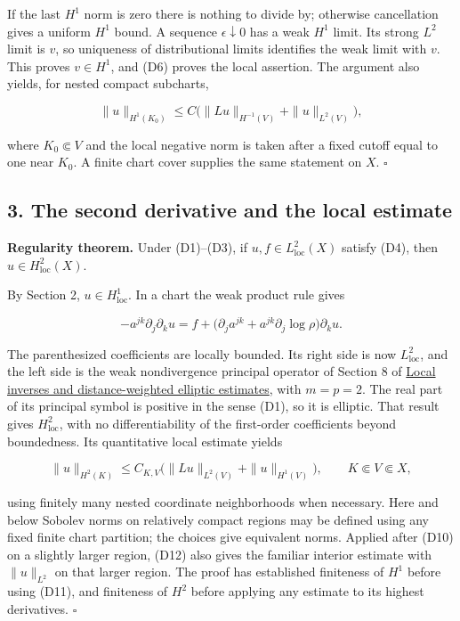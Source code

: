 \documentclass[
  11pt,
]{article}
\begin{document}
If the last \(H^1\) norm is zero there is nothing to divide by;
otherwise cancellation gives a uniform \(H^1\) bound. A sequence
\(\epsilon\downarrow0\) has a weak \(H^1\) limit. Its strong \(L^2\)
limit is \(v\), so uniqueness of distributional limits identifies the
weak limit with \(v\). This proves \(v\in H^1\), and (D6) proves the
local assertion. The argument also yields, for nested compact subcharts,

\[
 \|u\|_{H^1(K_0)}\leq C\bigl(\|Lu\|_{H^{-1}(V)}
                                      +\|u\|_{L^2(V)}\bigr),    \tag{D10}
\]

where \(K_0\Subset V\) and the local negative norm is taken after a
fixed cutoff equal to one near \(K_0\). A finite chart cover supplies
the same statement on \(X\). \(\square\)

\subsection{3. The second derivative and the local
estimate}\label{the-second-derivative-and-the-local-estimate}

\textbf{Regularity theorem.} Under (D1)--(D3), if
\(u,f\in L^2_{\mathrm{loc}}(X)\) satisfy (D4), then
\(u\in H^2_{\mathrm{loc}}(X)\).

By Section 2, \(u\in H^1_{\mathrm{loc}}\). In a chart the weak product
rule gives

\[
 -a^{jk}\partial_j\partial_k u
   =f+\bigl(\partial_j a^{jk}
                 +a^{jk}\partial_j\log\rho\bigr)\partial_k u.   \tag{D11}
\]

The parenthesized coefficients are locally bounded. Its right side is
now \(L^2_{\mathrm{loc}}\), and the left side is the weak nondivergence
principal operator of Section 8 of
\href{local-elliptic-coefficients.pdf}{Local inverses and
distance-weighted elliptic estimates}, with \(m=p=2\). The real part of
its principal symbol is positive in the sense (D1), so it is elliptic.
That result gives \(H^2_{\mathrm{loc}}\), with no differentiability of
the first-order coefficients beyond boundedness. Its quantitative local
estimate yields

\[
 \|u\|_{H^2(K)}\leq C_{K,V}
       \bigl(\|Lu\|_{L^2(V)}+\|u\|_{H^1(V)}\bigr),
                         \qquad K\Subset V\Subset X,             \tag{D12}
\]

using finitely many nested coordinate neighborhoods when necessary. Here
and below Sobolev norms on relatively compact regions may be defined
using any fixed finite chart partition; the choices give equivalent
norms. Applied after (D10) on a slightly larger region, (D12) also gives
the familiar interior estimate with \(\|u\|_{L^2}\) on that larger
region. The proof has established finiteness of \(H^1\) before using
(D11), and finiteness of \(H^2\) before applying any estimate to its
highest derivatives. \(\square\)
\end{document}
